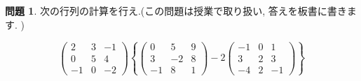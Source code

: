 \documentclass[dvipdfmx,a4paper,11pt]{article}
\theoremstyle{definition}
\newtheorem{ques}[thm]{問題}
\begin{document}
 \begin{ques}
 次の行列の計算を行え.(この問題は授業で取り扱い, 答えを板書に書きます. )

 $$
 \begin{pmatrix}
 2 &3&-1 \\
 0&5&4\\
 -1&0&-2
 \end{pmatrix}
 \left\{
 \begin{pmatrix}
 0 &5&9 \\
 3&-2&8\\
 -1&8&1
 \end{pmatrix}
 - 2
  \begin{pmatrix}
 -1 &0&1 \\
 3&2&3\\
 -4&2&-1
 \end{pmatrix}
\right\}
 $$
  \end{ques}
 
\end{document}
